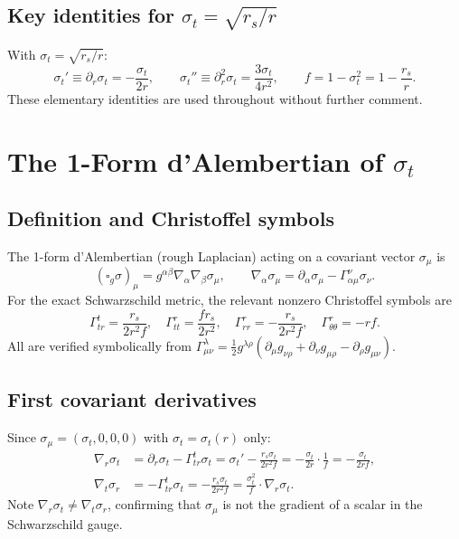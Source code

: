 \documentclass[11pt,a4paper]{article}
\theoremstyle{plain}
\theoremstyle{definition}
\newcommand{\sig}{\sigma}
\newcommand{\sigt}{\sigma_t}
\newcommand{\rs}{r_s}
\newcommand{\boxg}{\square_g}
\newcommand{\half}{\tfrac{1}{2}}
\begin{document}
\subsection{Key identities for $\sigt = \sqrt{\rs/r}$}

With $\sigt = \sqrt{\rs/r}$:
\begin{equation}\label{eq:sigma_derivs}
  \sigt' \equiv \partial_r\sigt = -\frac{\sigt}{2r}, \qquad
  \sigt'' \equiv \partial_r^2\sigt = \frac{3\sigt}{4r^2}, \qquad
  f = 1 - \sigt^2 = 1 - \frac{\rs}{r}.
\end{equation}
These elementary identities are used throughout without further comment.

\section{The 1-Form d'Alembertian of $\sigt$}

\subsection{Definition and Christoffel symbols}

The 1-form d'Alembertian (rough Laplacian) acting on a covariant
vector $\sig_\mu$ is
\begin{equation}
  (\boxg\sig)_\mu = g^{\alpha\beta}\nabla_\alpha\nabla_\beta\sig_\mu,
  \qquad
  \nabla_\alpha\sig_\mu = \partial_\alpha\sig_\mu - \Gamma^\nu_{\alpha\mu}\sig_\nu.
\end{equation}
For the exact Schwarzschild metric, the relevant nonzero Christoffel
symbols are
\begin{equation}\label{eq:christoffel}
  \Gamma^t_{tr} = \frac{\rs}{2r^2 f}, \quad
  \Gamma^r_{tt} = \frac{f\rs}{2r^2}, \quad
  \Gamma^r_{rr} = -\frac{\rs}{2r^2 f}, \quad
  \Gamma^r_{\theta\theta} = -rf.
\end{equation}
All are verified symbolically from $\Gamma^\lambda_{\mu\nu}
= \half g^{\lambda\rho}(\partial_\mu g_{\nu\rho}
+ \partial_\nu g_{\mu\rho} - \partial_\rho g_{\mu\nu})$.

\subsection{First covariant derivatives}

Since $\sig_\mu = (\sigt,0,0,0)$ with $\sigt = \sigt(r)$ only:
\begin{align}
  \nabla_r\sigt &= \partial_r\sigt - \Gamma^t_{tr}\sigt
  = \sigt' - \frac{\rs\sigt}{2r^2 f}
  = -\frac{\sigt}{2r}\cdot\frac{1}{f}
  = -\frac{\sigt}{2rf}, \label{eq:nabla_r}\\
  \nabla_t\sig_r &= -\Gamma^t_{tr}\sigt = -\frac{\rs\sigt}{2r^2 f}
  = \frac{\sigt^2}{f}\cdot\nabla_r\sigt. \label{eq:nabla_t}
\end{align}
Note $\nabla_r\sigt \ne \nabla_t\sig_r$, confirming that $\sig_\mu$ is
not the gradient of a scalar in the Schwarzschild gauge.
\end{document}
